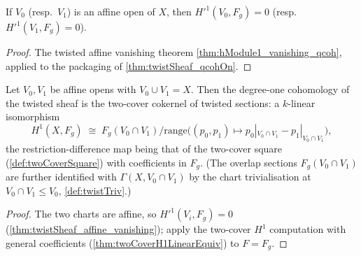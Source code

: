 \begin{theorem}
  \label{thm:twistSheaf_affine_vanishing}
  \leanok
  If \(V_0\) (resp.\ \(V_1\)) is an affine open of \(X\), then
  \(H'^1(V_0, F_g) = 0\) (resp.\ \(H'^1(V_1, F_g) = 0\)).
\end{theorem}
\begin{proof}
  \leanok
  The twisted affine vanishing theorem \ref{thm:hModule1_vanishing_qcoh}, applied to the
  packaging of \ref{thm:twistSheaf_qcohOn}.
\end{proof}

\begin{definition}
  \label{def:twistTwoCoverH1}
  \leanok
  Let \(V_0, V_1\) be affine opens with \(V_0 \cup V_1 = X\). Then the degree-one
  cohomology of the twisted sheaf is the two-cover cokernel of twisted sections: a
  \(k\)-linear isomorphism
  \[
    H^1(X, F_g) \;\cong\;
      F_g(V_0 \cap V_1) \big/ \mathrm{range}\bigl((p_0, p_1) \mapsto
        p_0|_{V_0 \cap V_1} - p_1|_{V_0 \cap V_1}\bigr),
  \]
  the restriction-difference map being that of the two-cover square
  (\ref{def:twoCoverSquare}) with coefficients in \(F_g\). (The overlap sections
  \(F_g(V_0 \cap V_1)\) are further identified with \(\Gamma(X, V_0 \cap V_1)\) by the
  chart trivialisation at \(V_0 \cap V_1 \le V_0\), \ref{def:twistTriv}.)
\end{definition}
\begin{proof}
  \leanok
  The two charts are affine, so \(H'^1(V_i, F_g) = 0\)
  (\ref{thm:twistSheaf_affine_vanishing}); apply the two-cover \(H^1\) computation with
  general coefficients (\ref{thm:twoCoverH1LinearEquiv}) to \(F = F_g\).
\end{proof}

